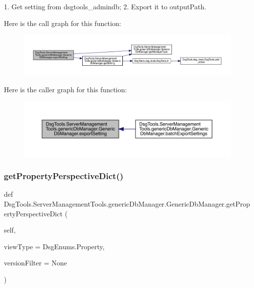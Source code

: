 \begin{DoxyVerb}1. Get setting from dsgtools_admindb;
2. Export it to outputPath.
\end{DoxyVerb}
 Here is the call graph for this function\+:
\nopagebreak
\begin{figure}[H]
\begin{center}
\leavevmode
\includegraphics[width=350pt]{class_dsg_tools_1_1_server_management_tools_1_1generic_db_manager_1_1_generic_db_manager_a7f0414ff8fbbea9649608f6093f8fe5a_cgraph}
\end{center}
\end{figure}
Here is the caller graph for this function\+:
\nopagebreak
\begin{figure}[H]
\begin{center}
\leavevmode
\includegraphics[width=350pt]{class_dsg_tools_1_1_server_management_tools_1_1generic_db_manager_1_1_generic_db_manager_a7f0414ff8fbbea9649608f6093f8fe5a_icgraph}
\end{center}
\end{figure}
\mbox{\label{class_dsg_tools_1_1_server_management_tools_1_1generic_db_manager_1_1_generic_db_manager_ac8baf4bdec5e9e8ce318b00b59369d13}} 
\subsubsection{\texorpdfstring{get\+Property\+Perspective\+Dict()}{getPropertyPerspectiveDict()}}
{\footnotesize\ttfamily def Dsg\+Tools.\+Server\+Management\+Tools.\+generic\+Db\+Manager.\+Generic\+Db\+Manager.\+get\+Property\+Perspective\+Dict (\begin{DoxyParamCaption}\item[{}]{self,  }\item[{}]{view\+Type = {\ttfamily DsgEnums.Property},  }\item[{}]{version\+Filter = {\ttfamily None} }\end{DoxyParamCaption})}

